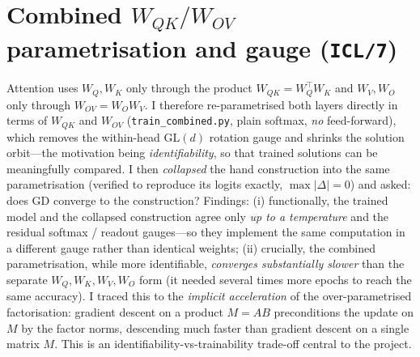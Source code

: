 \documentclass[12pt]{article}
\begin{document}
\section{Combined $W_{QK}/W_{OV}$ parametrisation and gauge (\texttt{ICL/7})}
Attention uses $W_Q,W_K$ only through the product $W_{QK}=W_Q^{\top}W_K$ and $W_V,W_O$ only through
$W_{OV}=W_OW_V$. I therefore re-parametrised both layers directly in terms of $W_{QK}$ and $W_{OV}$
(\texttt{train\_combined.py}, plain softmax, \emph{no} feed-forward), which removes the within-head
$\mathrm{GL}(d)$ rotation gauge and shrinks the solution orbit---the motivation being
\emph{identifiability}, so that trained solutions can be meaningfully compared. I then
\emph{collapsed} the hand construction into the same parametrisation (verified to reproduce its
logits exactly, $\max|\Delta|=0$) and asked: does GD converge to the construction? Findings:
(i) functionally, the trained model and the collapsed construction agree only \emph{up to a
temperature} and the residual softmax / readout gauges---so they implement the same computation in a
different gauge rather than identical weights; (ii) crucially, the combined parametrisation, while
more identifiable, \emph{converges substantially slower} than the separate $W_Q,W_K,W_V,W_O$ form
(it needed several times more epochs to reach the same accuracy). I traced this to the
\emph{implicit acceleration} of the over-parametrised factorisation: gradient descent on a product
$M=AB$ preconditions the update on $M$ by the factor norms, descending much faster than gradient
descent on a single matrix $M$. This is an identifiability-vs-trainability trade-off central to the
project.
\end{document}

